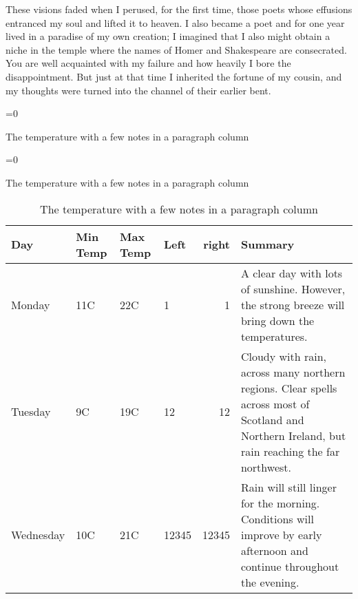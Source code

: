 These visions faded when I perused, for the first time, those poets whose effusions entranced my soul and lifted it to heaven. I also became a poet and for one year lived in a paradise of my own creation; I imagined that I also might obtain a niche in the temple where the names of Homer and Shakespeare are consecrated. You are well acquainted with my failure and how heavily I bore the disappointment. But just at that time I inherited the fortune of my cousin, and my thoughts were turned into the channel of their earlier bent.
\noindent
\begin{table}
	\ifnum{}=0 
		\caption*{The temperature with a few notes in a paragraph column}
	\else
		\ifnum{}=0 
			\caption*{The temperature with a few notes in a paragraph column}
		\else
			\caption{The temperature with a few notes in a paragraph column} 
		\fi
	\fi
	\begin{tabular}{llllrp{5cm}}
		\toprule
		Day & Min Temp & Max Temp & Left & right & Summary \\ 
		\midrule
		Monday & 11C & 22C & 1 & 1 & A clear day with lots of sunshine.  
		However, the strong breeze will bring down the temperatures. \\ 
		\midrule
		Tuesday & 9C & 19C & 12 & 12 & Cloudy with rain, across many northern regions. Clear 		spells 
		across most of Scotland and Northern Ireland, 
		but rain reaching the far northwest. \\ 
		\midrule
		Wednesday & 10C & 21C & 12345 & 12345 & Rain will still linger for the morning. 
		Conditions will improve by early afternoon and continue 
		throughout the evening. \\
		\bottomrule
	\end{tabular}
\end{table}
